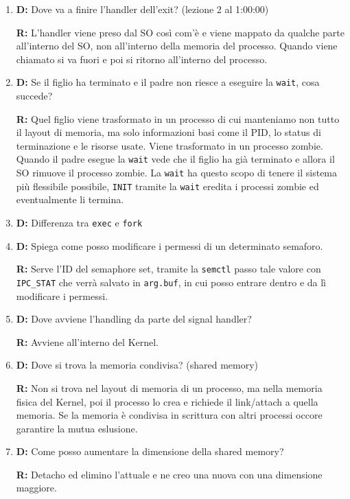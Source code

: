 \documentclass[a4paper, 12pt]{book}
\begin{document}
    \begin{enumerate}
        \item \textbf{D:} Dove va a finire l'handler dell'exit? (lezione 2 al 1:00:00)
        
        \textbf{R:} L'handler viene preso dal SO così com'è e viene 
        mappato da qualche parte all'interno del SO, non 
        all'interno della memoria del processo. Quando viene 
        chiamato si va fuori e poi si ritorno all'interno 
        del processo.
        \item \textbf{D:} Se il figlio ha terminato e il padre non riesce a 
        eseguire la \verb|wait|, cosa succede?

        \textbf{R:} Quel figlio viene trasformato in un processo di cui manteniamo 
        non tutto il layout di memoria, ma solo informazioni basi come il PID, lo status
        di terminazione e le risorse usate. Viene trasformato in un processo zombie. Quando il padre 
        esegue la \verb|wait| vede che il figlio ha già terminato e allora il SO 
        rimuove il processo zombie. La \verb|wait| ha questo scopo di tenere il sistema 
        più flessibile possibile, \verb|INIT| tramite la \verb|wait| eredita i processi 
        zombie ed eventualmente li termina.
        \item \textbf{D:} Differenza tra \verb|exec| e \verb|fork|
        \item \textbf{D:} Spiega come posso modificare i permessi 
        di un determinato semaforo. 

        \textbf{R:} Serve l'ID del semaphore set, tramite la \verb|semctl| 
        passo tale valore con \verb|IPC_STAT| che  verrà salvato 
        in \verb|arg.buf|, in cui posso entrare dentro e 
        da lì modificare i permessi.
        \item \textbf{D:} Dove avviene l'handling da parte del signal handler?
        
        \textbf{R:} Avviene all'interno del Kernel.
        \item \textbf{D:} Dove si trova la memoria condivisa? (shared memory)
        
        \textbf{R:} Non si trova nel layout di memoria di un processo, 
        ma nella memoria fisica del Kernel, poi il processo lo 
        crea e richiede il link/attach a quella memoria. Se la 
        memoria è condivisa in scrittura con altri processi 
        occore garantire la mutua eslusione.
        \item \textbf{D:} Come posso aumentare la dimensione della 
        shared memory?

        \textbf{R:} Detacho ed elimino l'attuale e ne creo una nuova 
        con una dimensione maggiore.
    \end{enumerate}

    









     


    
    
\end{document}

